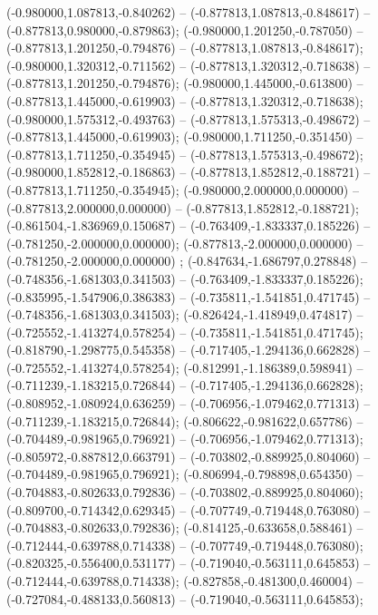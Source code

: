  (-0.980000,1.087813,-0.840262) -- (-0.877813,1.087813,-0.848617) -- (-0.877813,0.980000,-0.879863);
 (-0.980000,1.201250,-0.787050) -- (-0.877813,1.201250,-0.794876) -- (-0.877813,1.087813,-0.848617);
 (-0.980000,1.320312,-0.711562) -- (-0.877813,1.320312,-0.718638) -- (-0.877813,1.201250,-0.794876);
 (-0.980000,1.445000,-0.613800) -- (-0.877813,1.445000,-0.619903) -- (-0.877813,1.320312,-0.718638);
 (-0.980000,1.575312,-0.493763) -- (-0.877813,1.575313,-0.498672) -- (-0.877813,1.445000,-0.619903);
 (-0.980000,1.711250,-0.351450) -- (-0.877813,1.711250,-0.354945) -- (-0.877813,1.575313,-0.498672);
 (-0.980000,1.852812,-0.186863) -- (-0.877813,1.852812,-0.188721) -- (-0.877813,1.711250,-0.354945);
 (-0.980000,2.000000,0.000000) -- (-0.877813,2.000000,0.000000) -- (-0.877813,1.852812,-0.188721);
 (-0.861504,-1.836969,0.150687) -- (-0.763409,-1.833337,0.185226) -- (-0.781250,-2.000000,0.000000);
 (-0.877813,-2.000000,0.000000) -- (-0.781250,-2.000000,0.000000) ;
 (-0.847634,-1.686797,0.278848) -- (-0.748356,-1.681303,0.341503) -- (-0.763409,-1.833337,0.185226);
 (-0.835995,-1.547906,0.386383) -- (-0.735811,-1.541851,0.471745) -- (-0.748356,-1.681303,0.341503);
 (-0.826424,-1.418949,0.474817) -- (-0.725552,-1.413274,0.578254) -- (-0.735811,-1.541851,0.471745);
 (-0.818790,-1.298775,0.545358) -- (-0.717405,-1.294136,0.662828) -- (-0.725552,-1.413274,0.578254);
 (-0.812991,-1.186389,0.598941) -- (-0.711239,-1.183215,0.726844) -- (-0.717405,-1.294136,0.662828);
 (-0.808952,-1.080924,0.636259) -- (-0.706956,-1.079462,0.771313) -- (-0.711239,-1.183215,0.726844);
 (-0.806622,-0.981622,0.657786) -- (-0.704489,-0.981965,0.796921) -- (-0.706956,-1.079462,0.771313);
 (-0.805972,-0.887812,0.663791) -- (-0.703802,-0.889925,0.804060) -- (-0.704489,-0.981965,0.796921);
 (-0.806994,-0.798898,0.654350) -- (-0.704883,-0.802633,0.792836) -- (-0.703802,-0.889925,0.804060);
 (-0.809700,-0.714342,0.629345) -- (-0.707749,-0.719448,0.763080) -- (-0.704883,-0.802633,0.792836);
 (-0.814125,-0.633658,0.588461) -- (-0.712444,-0.639788,0.714338) -- (-0.707749,-0.719448,0.763080);
 (-0.820325,-0.556400,0.531177) -- (-0.719040,-0.563111,0.645853) -- (-0.712444,-0.639788,0.714338);
 (-0.827858,-0.481300,0.460004) -- (-0.727084,-0.488133,0.560813) -- (-0.719040,-0.563111,0.645853);
